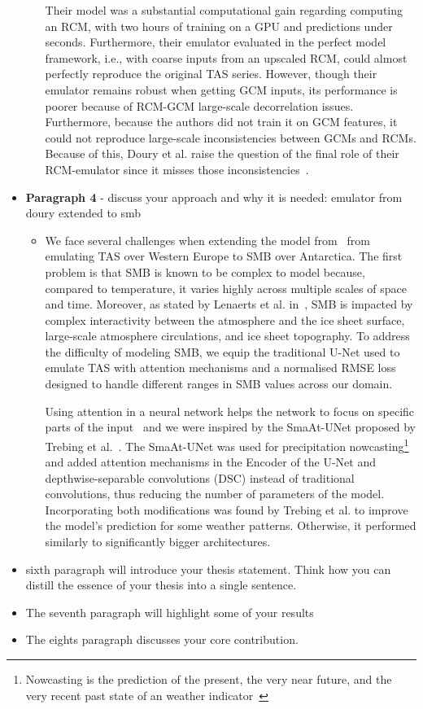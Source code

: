 \documentclass[a4paper,11pt,oneside]{report}
\begin{document}
\begin{itemize}
\begin{itemize}
       Their model was a substantial computational gain regarding computing an RCM, with two hours of training on a GPU and predictions under seconds. Furthermore, their emulator evaluated in the perfect model framework, i.e., with coarse inputs from an upscaled RCM, could almost perfectly reproduce the original TAS series. However, though their emulator remains robust when getting GCM inputs, its performance is poorer because of RCM-GCM large-scale decorrelation issues. Furthermore, because the authors did not train it on GCM features, it could not reproduce large-scale inconsistencies between GCMs and RCMs. Because of this, Doury et al. raise the question of the final role of their RCM-emulator since it misses those inconsistencies~\cite{Doury}. 
    \end{itemize}
    
    \item \textbf{Paragraph 4} - discuss your approach and why it is needed: emulator from doury extended to smb
    \begin{itemize}
        \item We face several challenges when extending the model from~\cite{Doury} from emulating TAS over Western Europe to SMB over Antarctica. The first problem is that SMB is known to be complex to model because, compared to temperature, it varies highly across multiple scales of space and time. Moreover, as stated by Lenaerts et al. in~\cite{Lenaerts2019}, SMB is impacted by complex interactivity between the atmosphere and the ice sheet surface, large-scale atmosphere circulations, and ice sheet topography. To address the difficulty of modeling SMB, we equip the traditional U-Net used to emulate TAS with attention mechanisms and a normalised RMSE loss designed to handle different ranges in SMB values across our domain. 
        
        Using attention in a neural network helps the network to focus on specific parts of the input~\cite{Sanghyun2018} and we were inspired by the SmaAt-UNet proposed by Trebing et al.~\cite{smatunet}. The SmaAt-UNet was used for precipitation nowcasting\footnote{Nowcasting is the prediction of the present, the very near future, and the very recent past state of an weather indicator~\cite{Nowcasting}} and added attention mechanisms in the Encoder of the U-Net and depthwise-separable convolutions (DSC) instead of traditional convolutions, thus reducing the number of parameters of the model. Incorporating both modifications was found by Trebing et al. to improve the model's prediction for some weather patterns. Otherwise, it performed similarly to significantly bigger architectures. 
    \end{itemize}
    \item sixth paragraph will introduce your thesis statement. Think how you can distill the essence of your thesis into a single sentence.
    \item The seventh paragraph will highlight some of your results
    \item The eights paragraph discusses your core contribution.

\end{itemize}
\end{document}

